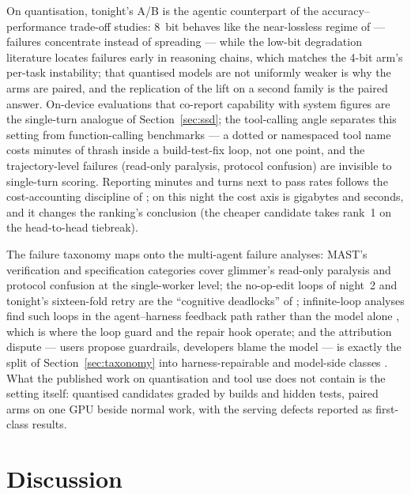 On quantisation, tonight's A/B is the agentic counterpart of the accuracy--performance trade-off studies: 8~bit
behaves like the near-lossless regime of \citet{Kurtic-2024aa} --- failures concentrate instead of spreading ---
while the low-bit degradation literature \citep{Li-2025aa} locates failures early in reasoning chains, which
matches the 4-bit arm's per-task instability; that quantised models are not uniformly weaker \citep{Fang-2025aa}
is why the arms are paired, and the replication of the lift on a second family is the paired answer. On-device
evaluations that co-report capability with system figures \citep{Song-2025aa} are the single-turn analogue of
Section~\ref{sec:ssd}; the tool-calling angle separates this setting from function-calling benchmarks
\citep{Patil-2024aa,Chen-2024aa} --- a dotted or namespaced tool name costs minutes of thrash inside a
build-test-fix loop, not one point, and the trajectory-level failures (read-only paralysis, protocol confusion)
are invisible to single-turn scoring. Reporting minutes and turns next to pass rates follows the cost-accounting
discipline of \citet{Kapoor-2024aa}; on this night the cost axis is gigabytes and seconds, and it changes the
ranking's conclusion (the cheaper candidate takes rank~1 on the head-to-head tiebreak).

The failure taxonomy maps onto the multi-agent failure analyses: MAST's verification and specification
categories \citep{Cemri-2025aa} cover glimmer's read-only paralysis and protocol confusion at the single-worker
level; the no-op-edit loops of night~2 and tonight's sixteen-fold retry are the ``cognitive deadlocks'' of
\citet{Liu-2025aa}; infinite-loop analyses find such loops in the agent--harness feedback path rather than the
model alone \citep{Hou-2026aa}, which is where the loop guard and the repair hook operate; and the attribution
dispute --- users propose guardrails, developers blame the model --- is exactly the split of
Section~\ref{sec:taxonomy} into harness-repairable and model-side classes \citep{Chen-2026aa}. What the published
work on quantisation and tool use does not contain is the setting itself: quantised candidates graded by builds
and hidden tests, paired arms on one GPU beside normal work, with the serving defects reported as first-class
results.

\section{Discussion}\label{sec:discussion}

